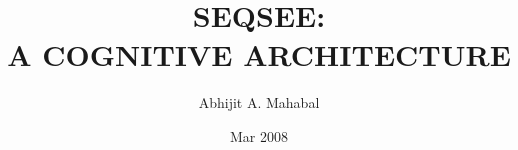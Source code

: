 \title{SEQSEE: \\ A COGNITIVE ARCHITECTURE}
\author{Abhijit A. Mahabal}
\date{Mar 2008}

\renewcommand{\maketitlehookc}{\vfill\begin{center} 
Submitted to the faculty of the University Graduate School \\
in partial fulfillment of the requirements\\
for the degree\\
Doctor of Philosophy\\
in the Department of Cognitive Science,\\
 and\\
in the Department of Computer Science,\\
Indiana University
 \end{center}\vskip0.8in}

\renewcommand{\maketitlehookd}{\vskip1in}

